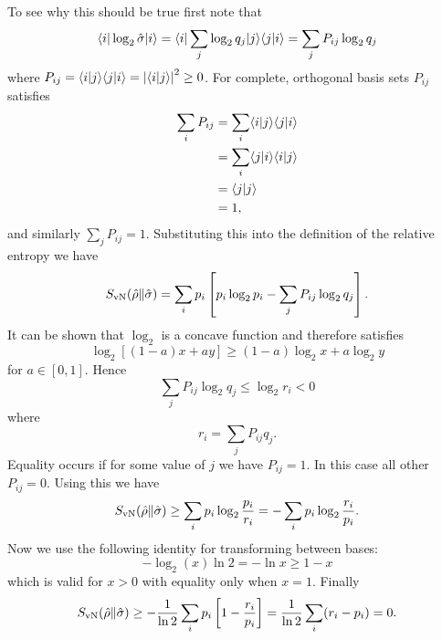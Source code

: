     To see why this should be true first note that
    \[\langle {i} \vert\log_2\hat{\sigma}\vert {i} \rangle = \langle {i} \vert\sum_j\log_2q_j\vert {j} \rangle\langle {j} \vert {i} \rangle = \sum_jP_{ij}\log_2q_j\]
    where \(P_{ij} = \langle {i} \vert {j} \rangle\langle {j} \vert {i} \rangle = \abs{\langle {i} \vert {j} \rangle}^2 \ge 0\).
    For complete, orthogonal basis sets \(P_{ij}\) satisfies
    \begin{align*}
        \sum_i P_{ij} &= \sum_i \langle {i} \vert {j} \rangle\langle {j} \vert {i} \rangle\\
        &= \sum_i \langle {j} \vert {i} \rangle\langle {i} \vert {j} \rangle\\
        &= \langle {j} \vert {j} \rangle\\
        &= 1,
    \end{align*}
    and similarly \(\sum_j P_{ij} = 1\).
    Substituting this into the definition of the relative entropy we have
    \[S_{\mathrm{vN}}(\hat{\rho}\|\hat{\sigma}) = \sum_{i} p_i \left[ p_i\log_2 p_i - \sum_j P_{ij}\log_2q_j \right].\]
    It can be shown that \(\log_2\) is a concave function and therefore satisfies
    \[\log_2[(1 - a)x + ay] \ge (1 - a)\log_2x + a\log_2y\]
    for \(a\in[0, 1]\).
    Hence
    \[\sum_j P_{ij}\log_2q_j \le \log_2 r_i < 0\]
    where
    \[r_i = \sum_j P_{ij}q_j.\]
    Equality occurs if for some value of \(j\) we have \(P_{ij} = 1\).
    In this case all other \(P_{ij} = 0\).
    Using this we have
    \[S_{\mathrm{vN}}(\hat{\rho}\|\hat{\sigma}) \ge \sum_i p_i \log_2 \frac{p_i}{r_i} = -\sum_i p_i \log_2 \frac{r_i}{p_i}.\]
    Now we use the following identity for transforming between bases:
    \[-\log_2(x)\ln 2 = -\ln x \ge 1 - x\]
    which is valid for \(x > 0\) with equality only when \(x = 1\).
    Finally
    \[S_{\mathrm{vN}}(\hat{\rho}\|\hat{\sigma}) \ge - \frac{1}{\ln 2} \sum_i p_i\left[ 1 - \frac{r_i}{p_i} \right] = \frac{1}{\ln 2} \sum_i (r_i - p_i) = 0.\]
    
